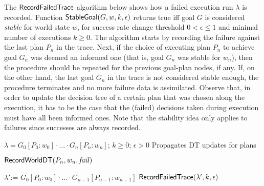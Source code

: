 The $\mathsf{RecordFailedTrace}$ algorithm below shows how a failed execution run $\lambda$ is
recorded. Function
$\mathsf{StableGoal}(G,w,k,\epsilon)$ returns true iff goal $G$ is considered \textit{stable} for world state $w$, for success rate change 
threshold $0 < \epsilon \leq 1$ and minimal number of executions $k
\geq 0$.
%
The algorithm starts by recording the failure against the last plan $P_n$ in the
trace.
Next, if the choice of executing plan $P_n$ to achieve goal $G_n$ was deemed an
informed one (that is, goal $G_n$ was stable for $w_n$), then the procedure
should be repeated for the previous goal-plan nodes, if any.
If, on the other hand, the last goal $G_n$ in the trace is not considered stable
enough, the procedure terminates and no more failure data is assimilated.
Observe that, in order to update the decision tree of a certain plan that was
chosen along the execution, it has to be the case that the (failed) decisions
taken during execution must have all been informed ones.
Note that the stability idea only applies to failures since successes are always recorded.
 \renewcommand{\algorithmiccomment}[1]{\hfill \texttt{\small // #1}}
 \newcommand{\assign}{\mbox{:=\ }}
 \begin{algorithm}[h]
	\caption{$\RecordTrace(\lambda,k,\epsilon)$}\label{algo:record_failed_exec}
	\label{alg:NDS}
  \begin{algorithmic}[1]
    \REQUIRE $\lambda=G_0[P_0:w_0] \cdot \ldots \cdot G_n[P_n:w_n]$; $k\geq0$;
    $\epsilon > 0$ \ENSURE Propagates DT updates for plans

	\STATE $\mathsf{RecordWorldDT}(P_n,w_n,\mbox{\emph{fail}})$

    	 \STATE $\lambda' \assign G_0[P_0:w_0] \cdot \ldots \cdot
    				G_{n-1}[P_{n-1}:w_{n-1}]$
    	\STATE $\mathsf{RecordFailedTrace}(\lambda',k,\epsilon)$ 
    \ENDIF
  \end{algorithmic}
\end{algorithm}

 



